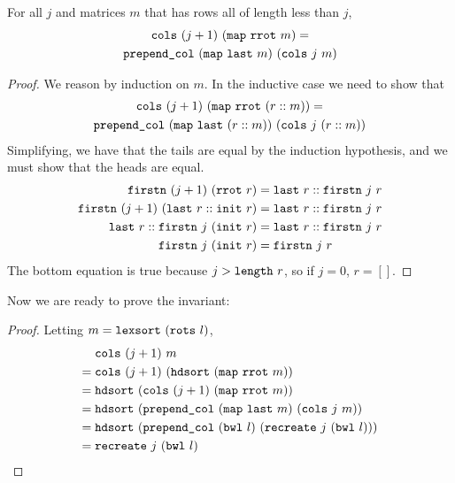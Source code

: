 \documentclass[sigplan,10pt,anonymous,review]{thesis}
\begin{document}
\begin{theorem}
  For all $j$ and matrices $m$ that has rows all of length less than $j$,
  \begin{gather*}
    \texttt{\textup{cols}}~(j+1)~(\texttt{\textup{map}}~\texttt{\textup{rrot}}~m) = \\
    \texttt{\textup{prepend\_col}}~(\texttt{\textup{map}}~\texttt{\textup{last}}~m)~(\texttt{\textup{cols}}~j~m)
  \end{gather*}
\end{theorem}
\begin{proof}
  We reason by induction on $m$. In the inductive case we need to show that
  \begin{gather*}
    \texttt{\textup{cols}}~(j+1)~(\texttt{\textup{map}}~\texttt{\textup{rrot}}~(r::m)) = \\
    \texttt{\textup{prepend\_col}}~(\texttt{\textup{map}}~\texttt{\textup{last}}~(r::m))~(\texttt{\textup{cols}}~j~(r::m))
  \end{gather*}
  Simplifying, we have that the tails are equal by the induction
  hypothesis, and we must show that the heads are equal.
  \begin{align*}
    \texttt{\textup{firstn}}~(j+1)~(\texttt{\textup{rrot}}~r) &= \texttt{\textup{last}}~r :: \texttt{\textup{firstn}}~j~r \\
    \texttt{\textup{firstn}}~(j+1)~(\texttt{\textup{last}}~r :: \texttt{\textup{init}}~r) &= \texttt{\textup{last}}~r
    :: \texttt{\textup{firstn}}~j~r \\
    \texttt{\textup{last}}~r :: \texttt{\textup{firstn}}~j~(\texttt{\textup{init}}~r) &= \texttt{\textup{last}}~r :: \texttt{\textup{firstn}}~j~r \\
    \texttt{\textup{firstn}}~j~(\texttt{\textup{init}}~r) &= \texttt{\textup{firstn}}~j~r
  \end{align*}
  The bottom equation is true because $j > \texttt{\textup{length}}~r$, so if $j=
  0$, $r = []$.
\end{proof}

Now we are ready to prove the invariant:
\recreatecorrectinv
\begin{proof}
  Letting $m = \texttt{\textup{lexsort}}~(\texttt{\textup{rots}}~l)$,
  \begin{align*}
    &\texttt{\textup{cols}}~(j+1)~m \\
    ={}& \texttt{\textup{cols}}~(j+1)~(\texttt{\textup{hdsort}}~(\texttt{\textup{map}}~\texttt{\textup{rrot}}~m)) \\
    ={}&
    \texttt{\textup{hdsort}}~(\texttt{\textup{cols}}~(j+1)~(\texttt{\textup{map}}~\texttt{\textup{rrot}}~m)) \\
    ={}&
    \texttt{\textup{hdsort}}~(\texttt{\textup{prepend\_col}}~(\texttt{\textup{map}}~\texttt{\textup{last}}~m)~(\texttt{\textup{cols}}~j~m)) \\
    ={}&
    \texttt{\textup{hdsort}}~(\texttt{\textup{prepend\_col}}~(\texttt{\textup{bwl}}~l)~(\texttt{\textup{recreate}}~j~(\texttt{\textup{bwl}}~l))) \\
    ={}& \texttt{\textup{recreate}}~j~(\texttt{\textup{bwl}}~l) \qedhere
  \end{align*}
\end{proof}
\end{document}
